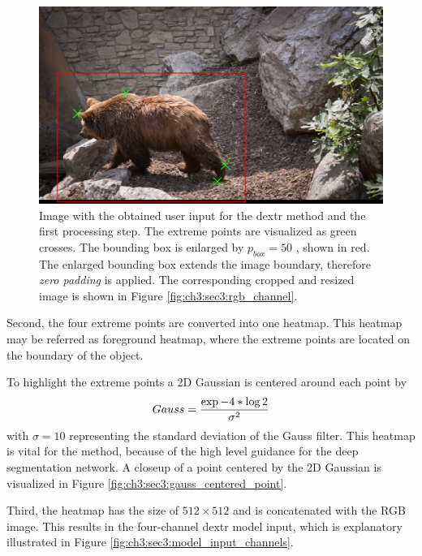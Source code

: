 \begin{figure}
	\includegraphics[width=\linewidth]{figures/chap33_bear_bbox.png}
	\caption[DEXTR User Interaction]{		
		Image with the obtained user input for the \gls{dextr} method and the first processing step.
		The extreme points are visualized as green crosses.
		The bounding box is enlarged by $p_{{box}} = 50$ , shown in red.
		The enlarged bounding box extends the image boundary, therefore \textit{zero padding} is applied.
		The corresponding cropped and resized image is shown in Figure \ref{fig:ch3:sec3:rgb_channel}.
	}
	\label{fig:ch3:sec3:user_interaction}
\end{figure}


Second, the four extreme points are converted into one heatmap.
This heatmap may be referred as foreground heatmap, where the extreme points are located on the boundary of the object.

To highlight the extreme points a 2D Gaussian is centered around each point by
\begin{equation} \label{equ:gauss}
	\centering
	Gauss = \frac{\exp{-4 * \log 2 }}{\sigma^{2}}
\end{equation}
with $\sigma = 10$ representing the standard deviation of the Gauss filter.
This heatmap is vital for the method, because of the high level guidance for the deep segmentation network.
A closeup of a point centered by the 2D Gaussian is visualized in Figure \ref{fig:ch3:sec3:gauss_centered_point}.

Third, the heatmap has the size of $512 \times 512$  and is concatenated with the RGB image.
This results in the four-channel \gls{dextr} model input, which is explanatory illustrated in Figure \ref{fig:ch3:sec3:model_input_channels}.

